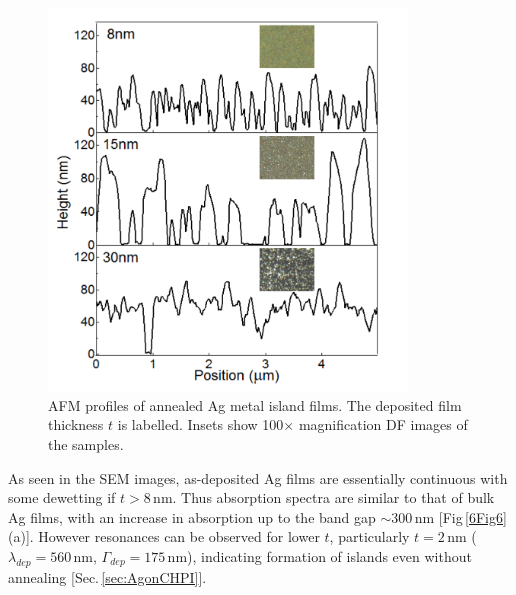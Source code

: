 \begin{figure}[h!] 
\centering    
\includegraphics[width=0.85\textwidth]{Fig5}
\caption{AFM profiles of annealed Ag metal island films. The deposited film thickness $t$ is labelled. Insets show 100$\times$ magnification DF images of the samples.}
\label{6Fig5}
\end{figure}

As seen in the SEM images, as-deposited Ag films are essentially continuous with some dewetting if $t>8$\,nm. Thus absorption spectra are similar to that of bulk Ag films, with an increase in absorption up to the band gap $\sim300$\,nm [Fig\,\ref{6Fig6}(a)]. However resonances can be observed for lower $t$, particularly $t=2$\,nm ($\lambda_{dep} = 560$\,nm, $\Gamma_{dep} = 175$\,nm), indicating formation of islands even without annealing [Sec.\,\ref{sec:AgonCHPI}]. 

